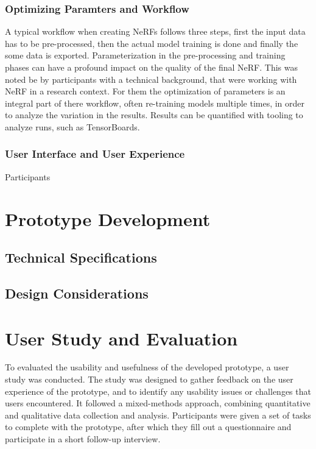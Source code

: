 \subsubsection{Optimizing Paramters and Workflow}

A typical workflow when creating NeRFs follows three steps, first the input data has to be pre-processed, then the actual model training is done and finally the some data is exported. 
Parameterization in the pre-processing and training phases can have a profound impact on the quality of the final NeRF. 
This was noted be by participants with a technical background, that were working with NeRF in a research context.
For them the optimization of parameters is an integral part of there workflow, often re-training models multiple times, in order to analyze the variation in the results.
Results can be quantified with tooling to analyze runs, such as TensorBoards.

\subsubsection{User Interface and User Experience}

Participants 

\section{Prototype Development}
\label{sec:methodology:proptotype}

\subsection{Technical Specifications}
\label{sec:methodology:proptotype:specs}

\subsection{Design Considerations}
\label{sec:methodology:proptotype:design}

\section{User Study and Evaluation}
\label{sec:methodology:study}

To evaluated the usability and usefulness of the developed prototype, a user study was conducted. 
The study was designed to gather feedback on the user experience of the prototype, and to identify any usability issues or challenges that users encountered.
It followed a mixed-methods approach, combining quantitative and qualitative data collection and analysis. 
Participants were given a set of tasks to complete with the prototype, after which they fill out a questionnaire and participate in a short follow-up interview.

